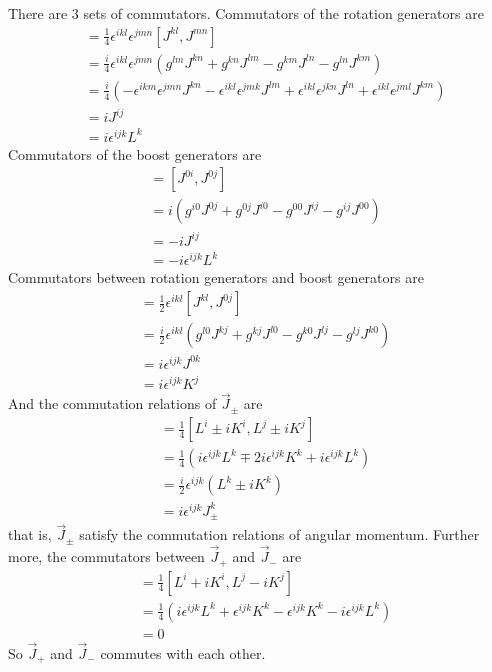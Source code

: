 \solution
\begin{problembody}
    \item There are 3 sets of commutators. Commutators of the rotation generators are
    \begin{align*}
        [L^i, L^j] & = \frac{1}{4} \epsilon^{ikl} \epsilon^{jmn} [J^{kl}, J^{mn}]\\
        & = \frac{i}{4} \epsilon^{ikl} \epsilon^{jmn} \left(g^{lm}J^{kn} + g^{kn}J^{lm} - g^{km}J^{ln} - g^{ln}J^{km}\right)\\
        & = \frac{i}{4} \left(-\epsilon^{ikm}\epsilon^{jmn}J^{kn} - \epsilon^{ikl}\epsilon^{jmk}J^{lm} 
        + \epsilon^{ikl}\epsilon^{jkn}J^{ln} + \epsilon^{ikl}\epsilon^{jml}J^{km}\right)\\
        & = i J^{ij}\\
        & = i \epsilon^{ijk} L^k
    \end{align*}
    Commutators of the boost generators are
    \begin{align*}
        [K^i, K^j] & = [J^{0i}, J^{0j}]\\
        & = i\left(g^{i0}J^{0j} + g^{0j}J^{i0} - g^{00}J^{ij} - g^{ij}J^{00}\right)\\
        & = -iJ^{ij}\\
        & = -i \epsilon^{ijk} L^k
    \end{align*}
    Commutators between rotation generators and boost generators are
    \begin{align*}
        [L^i, K^j] & = \frac{1}{2} \epsilon^{ikl} [J^{kl}, J^{0j}]\\
        & = \frac{i}{2} \epsilon^{ikl} \left(g^{l0}J^{kj} + g^{kj}J^{l0} - g^{k0}J^{lj} - g^{lj}J^{k0}\right)\\
        & = i\epsilon^{ijk} J^{0k}\\
        & = i\epsilon^{ijk} K^j
    \end{align*}
    And the commutation relations of $\vec{J}_\pm$ are
    \begin{align*}
        [J^i_\pm, J^j_\pm] & = \frac{1}{4}[L^i \pm iK^i, L^j \pm iK^j]\\
        & = \frac{1}{4} \left(i\epsilon^{ijk}L^k \mp 2i\epsilon^{ijk}K^k + i\epsilon^{ijk}L^k\right)\\
        & = \frac{i}{2} \epsilon^{ijk} \left(L^k \pm iK^k\right)\\
        & = i\epsilon^{ijk} J^k_\pm
    \end{align*}
    that is, $\vec{J}_\pm$ satisfy the commutation relations of angular momentum. Further more, the commutators between 
    $\vec{J}_+$ and $\vec{J}_-$ are
    \begin{align*}
        [J^i_+, J^j_-] & = \frac{1}{4} [L^i + iK^i, L^j - iK^j]\\
        & = \frac{1}{4} \left(i\epsilon^{ijk}L^k + \epsilon^{ijk}K^k - \epsilon^{ijk}K^k -i\epsilon^{ijk}L^k\right)\\
        & = 0
    \end{align*}
    So $\vec{J}_+$ and $\vec{J}_-$ commutes with each other.


\end{problembody}
